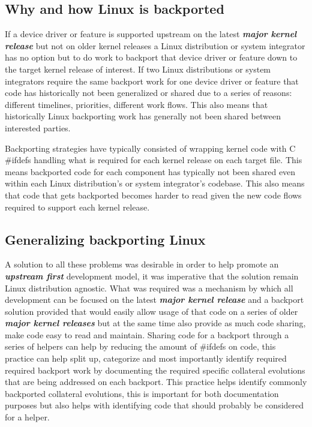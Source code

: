 \subsection{Why and how Linux is backported}

If a device driver or feature is supported upstream on the latest
\textbf{\textit{major kernel release}} but not on older kernel
releases a Linux distribution or system integrator has no option
but to do work to backport that device driver or feature down to
the target kernel release of interest. If two Linux distributions or
system integrators require the same backport work for one device driver
or feature that code has historically not been generalized or shared
due to a series of reasons: different timelines, priorities,
different work flows. This also means that historically Linux backporting
work has generally not been shared between interested parties.

Backporting strategies have typically consisted of wrapping kernel
code with C \#ifdefs handling what is required for each kernel release on each
target file. This means backported code for each component has typically not
been shared even within each Linux distribution's or system integrator's
codebase. This also means that code that gets backported becomes harder to read
given the new code flows required to support each kernel release.

\subsection{Generalizing backporting Linux}

A solution to all these problems was desirable in order to help promote an
\textbf{\textit{upstream first}} development model, it was imperative that the
solution remain Linux distribution agnostic. What was required was a mechanism
by which all development can be focused on the latest \textbf{\textit{major kernel
release}} and a backport solution provided that would easily allow usage of
that code on a series of older \textbf{\textit{major kernel releases}} but at
the same time also provide as much code sharing, make code easy to read and
maintain. Sharing code for a backport through a series of helpers can help by
reducing the amount of \#ifdefs on code, this practice can help split up,
categorize and most importantly identify required required backport work by
documenting the required specific collateral evolutions that are being
addressed on each backport. This practice helps identify commonly backported
collateral evolutions, this is important for both documentation purposes but
also helps with identifying code that should probably be considered for a
helper.

